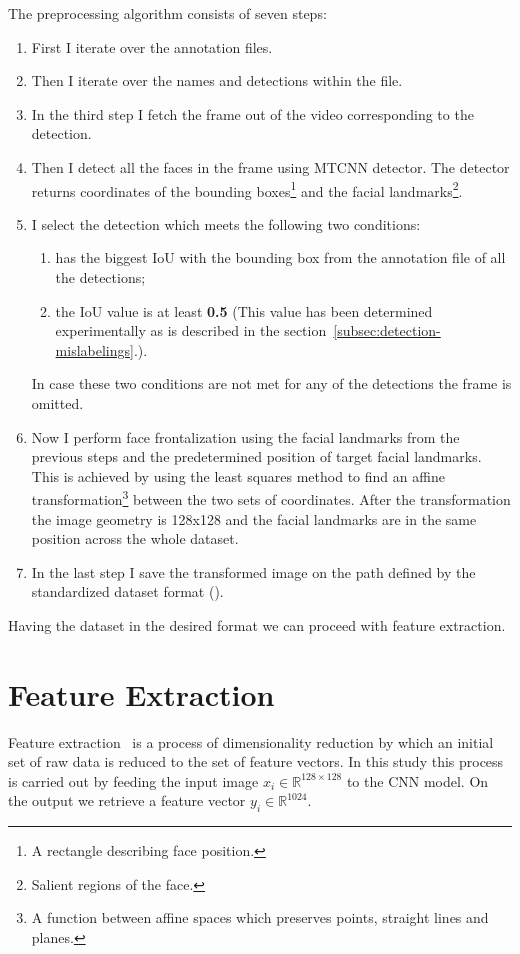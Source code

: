 The preprocessing algorithm consists of seven steps:
\begin{enumerate}
    \item First I iterate over the annotation files.
    \item Then I iterate over the names and detections within the file.
    \item In the third step I fetch the frame out of the video corresponding to the detection.
    \item Then I detect all the faces in the frame using MTCNN detector.
    The detector returns coordinates of the bounding boxes\footnote{A rectangle describing face position.} and the
    facial landmarks\footnote{Salient regions of the face.}.
    \item I select the detection which meets the following two conditions:
    \begin{enumerate}
        \item has the biggest IoU with the bounding box from the annotation file of all the detections;
        \item the IoU value is at least \textbf{0.5} (This value has been determined experimentally as
        is described in the section~\ref{subsec:detection-mislabelings}.).
    \end{enumerate}
    In case these two conditions are not met for any of the detections the frame is omitted.
    \item Now I perform face frontalization using the facial landmarks from the previous steps and the predetermined
    position of target facial landmarks.
    This is achieved by using the least squares method to find an affine transformation\footnote{A function between
    affine spaces which preserves points, straight lines and planes.} between the two sets of coordinates.
    After the transformation the image geometry is 128x128 and the facial landmarks are in the same position across
    the whole dataset.
    \item In the last step I save the transformed image on the path defined by the standardized dataset format
    ().
\end{enumerate}

Having the dataset in the desired format we can proceed with feature extraction.

\section{Feature Extraction}\label{sec:feature-extraction}
Feature extraction~\cite{FeEx} is a process of dimensionality reduction by which an initial set of raw data
is reduced to the set of feature vectors.
In this study this process is carried out by feeding the input image $x_i \in \mathbb{R}^{128\times128 }$ to the CNN model.
On the output we retrieve a feature vector $y_i \in \mathbb{R}^{1024}$.


